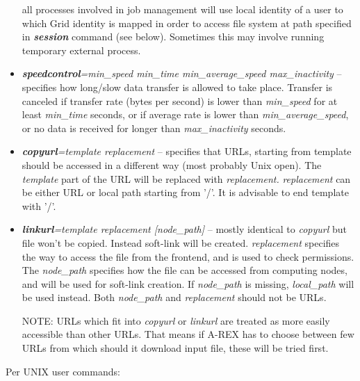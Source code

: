\documentclass{article}                            %
\begin{document}
\begin{itemize}
all processes involved in job management will use local identity of
a user to which Grid identity is mapped in order to access file system
at path specified in \textbf{\textit{session}} command (see below).
Sometimes this may involve running temporary external process.
\item \textbf{\textit{speedcontrol}}\textit{=min\_speed min\_time min\_average\_speed
max\_inactivity} -- specifies how long/slow data transfer is allowed
to take place. Transfer is canceled if transfer rate (bytes per second)
is lower than \emph{min\_speed} for at least \emph{min\_time} seconds,
or if average rate is lower than \emph{min\_average\_speed}, or no
data is received for longer than \textit{max\_inactivity} seconds.
\item \textbf{\textit{copyurl}}\textit{=template replacement} -- specifies
that URLs, starting from template should be accessed in a different
way (most probably Unix open). The \textit{template} part of the URL
will be replaced with \textit{replacement.} \textit{replacement} can
be either URL or local path starting from '/'. It is advisable to
end template with '/'.
\item \textbf{\textit{linkurl}}\textit{=template replacement {[}node\_path]}
-- mostly identical to \textit{copyurl} but file won't be copied. Instead
soft-link will be created. \textit{replacement} specifies the way
to access the file from the frontend, and is used to check permissions.
The \textit{node\_path} specifies how the file can be accessed from
computing nodes, and will be used for soft-link creation. If \textit{node\_path}
is missing, \textit{local\_path} will be used instead. Both \textit{node\_path}
and \textit{replacement} should not be URLs.
\begin{framed}
NOTE: URLs which fit into \textit{copyurl} or \textit{linkurl} are
treated as more easily accessible than other URLs. That means if A-REX
has to choose between few URLs from which should it download input
file, these will be tried first.
\end{framed}
\end{itemize}

Per UNIX user commands:
\end{document}

